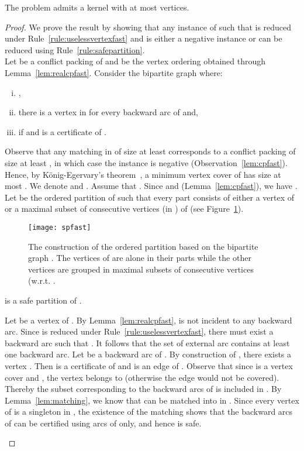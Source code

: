 \begin{theorem} \label{thm:fast}
The \FAST{} problem admits a kernel with at most  vertices.\end{theorem}
\begin{proof}
We prove the result by showing that any instance  of \FAST{} such that  is reduced under Rule~\ref{rule:uselessvertexfast} and  is either a negative instance or can be reduced using Rule~\ref{rule:safepartition}. \\ 

Let  be a conflict packing of  and  be the vertex ordering obtained through Lemma~\ref{lem:realcpfast}. 
Consider the bipartite graph  where:
\begin{enumerate}[(i)]
\item , 
\vspace{-0.2cm}
\item there is a vertex  in  for every backward arc  of  and, 
\vspace{-0.2cm}
\item  if  and  is a certificate of .
\end{enumerate}	 
	
Observe that any matching in  of size at least  corresponds to a conflict packing of size at least , in which case the instance is negative (Observation~\ref{lem:cpfast}). Hence, by K\"onig-Egervary's theorem~\cite{BM76}, a minimum vertex cover  of  has size at most . We denote  and .
Assume that . Since  and   (Lemma~\ref{lem:cpfast}), we have 
. Let  be the ordered partition of  such that every part  consists of either a vertex of  or a maximal subset of consecutive vertices (in ) of  (see Figure~\ref{fig:spfast}).

\begin{figure}[h]
\centerline{\texttt{[image: spfast]}}
\caption{The construction of the ordered partition  based on the bipartite graph . The vertices of  are alone in their parts while the other vertices are grouped in maximal subsets of consecutive vertices (w.r.t. .  \label{fig:spfast}}
\end{figure}

\begin{claim} \label{claim:pissafe}
 is a safe partition of .
\end{claim}
\begin{proofclaim}
Let  be a vertex of . By Lemma~\ref{lem:realcpfast},  is not incident to any backward arc.
Since  is reduced under Rule~\ref{rule:uselessvertexfast}, there must exist a backward arc  such that . It follows that the set  of external arc contains at least one backward arc. 
Let  be a backward arc of . By construction of , there exists a vertex . Then  is a certificate of  and  is an edge of . Observe that since  is a vertex cover and , the vertex  belongs to  (otherwise the edge  would not be covered). Thereby the subset  corresponding to the backward arcs of  is included in . 
By Lemma~\ref{lem:matching}, we know that  can be matched into  in . 
Since every vertex of  is a singleton in , the existence of the matching shows that the backward arcs of  can be certified using arcs of  only, and hence  is safe. 
\end{proofclaim}


\end{proof}
